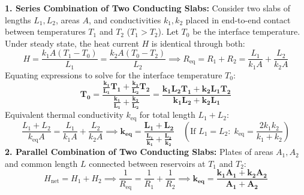 \documentclass[10pt,a4paper]{article}
\begin{document}
\begin{formulabox}
\textbf{1. Series Combination of Two Conducting Slabs:}
Consider two slabs of lengths $L_1, L_2$, areas $A$, and conductivities $k_1, k_2$ placed in end-to-end contact between temperatures $T_1$ and $T_2$ ($T_1 > T_2$). Let $T_0$ be the interface temperature. Under steady state, the heat current $H$ is identical through both:
\begin{equation}
  H = \frac{k_1 A (T_1 - T_0)}{L_1} = \frac{k_2 A (T_0 - T_2)}{L_2} \implies R_{\text{eq}} = R_1 + R_2 = \frac{L_1}{k_1 A} + \frac{L_2}{k_2 A}
\end{equation}
Equating expressions to solve for the interface temperature $T_0$:
\begin{equation}
  \mathbf{T_0 = \frac{\frac{k_1}{L_1} T_1 + \frac{k_2}{L_2} T_2}{\frac{k_1}{L_1} + \frac{k_2}{L_2}} = \frac{k_1 L_2 T_1 + k_2 L_1 T_2}{k_1 L_2 + k_2 L_1}}
\end{equation}
Equivalent thermal conductivity $k_{\text{eq}}$ for total length $L_1 + L_2$:
\begin{equation}
  \frac{L_1 + L_2}{k_{\text{eq}} A} = \frac{L_1}{k_1 A} + \frac{L_2}{k_2 A} \implies \mathbf{k_{\text{eq}} = \frac{L_1 + L_2}{\frac{L_1}{k_1} + \frac{L_2}{k_2}}} \quad \left(\text{If } L_1 = L_2: \; k_{\text{eq}} = \frac{2k_1 k_2}{k_1 + k_2}\right)
\end{equation}
\textbf{2. Parallel Combination of Two Conducting Slabs:}
Plates of areas $A_1, A_2$ and common length $L$ connected between reservoirs at $T_1$ and $T_2$:
\begin{equation}
  H_{\text{net}} = H_1 + H_2 \implies \frac{1}{R_{\text{eq}}} = \frac{1}{R_1} + \frac{1}{R_2} \implies \mathbf{k_{\text{eq}} = \frac{k_1 A_1 + k_2 A_2}{A_1 + A_2}}
\end{equation}
\end{formulabox}
\end{document}
